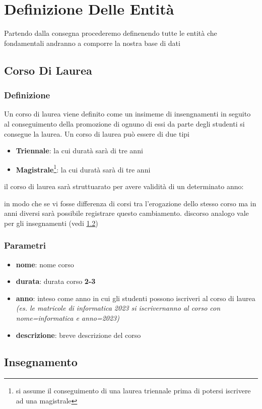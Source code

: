 \section{Definizione Delle Entità}
Partendo dalla consegna procederemo definenendo tutte le entità che fondamentali andranno a comporre la nostra base di dati 
\subsection{Corso Di Laurea} \label{Corso Di Laurea}
\subsubsection{Definizione}
Un corso di laurea viene definito come un insimeme di insengnamenti in seguito al conseguimento della promozione di ognuno di essi da parte degli studenti  si consegue la laurea.
Un corso di laurea può essere di due tipi 
\begin{itemize}
    \item \textbf{Triennale}: la cui duratà sarà di tre anni
    \item \textbf{Magistrale}\footnote{si assume il conseguimento di una laurea triennale prima di potersi iscrivere ad una magistrale}: la cui duratà sarà di tre anni
\end{itemize}
il corso di laurea sarà struttuarato per avere validità di un determinato anno:

in modo che se vi fosse differenza di corsi tra l'erogazione dello stesso corso ma in anni diversi sarà possibile registrare questo cambiamento.
discorso analogo vale per gli insegnamenti (vedi \ref{Insegnamento})
\subsubsection{Parametri}
\begin{itemize}
    \item \textbf{nome}: nome corso
    \item \textbf{durata}: durata corso \textbf{2-3}
    \item \textbf{anno}: inteso come anno in cui gli studenti possono iscriveri al corso di laurea \textit{(es. le matricole di informatica 2023 si iscrivernanno al corso con nome=informatica e anno=2023)}
    \item \textbf{descrizione}: breve descrizione del corso
\end{itemize}
\subsection{Insegnamento} \label{Insegnamento}
